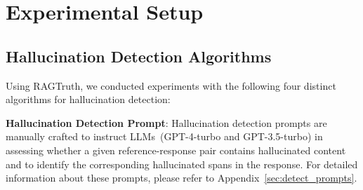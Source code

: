 \documentclass[11pt]{article}
\newcommand{\CorpusName}{RAGTruth}
\begin{document}
\section{Experimental Setup}

\subsection{Hallucination Detection Algorithms}



Using {\CorpusName}, we conducted experiments with the following four distinct algorithms for hallucination detection:

\noindent \textbf{Hallucination Detection Prompt}: Hallucination detection prompts are manually crafted to instruct LLMs~(GPT-4-turbo and GPT-3.5-turbo) in assessing whether a given reference-response pair contains hallucinated content and to identify the corresponding hallucinated spans in the response. 
For detailed information about these prompts, please refer to Appendix~\ref{sec:detect_prompts}. 
\end{document}
